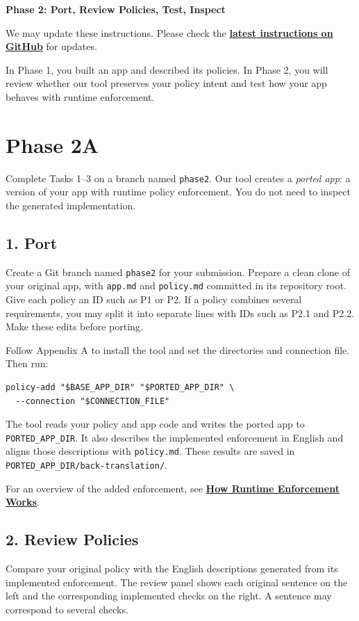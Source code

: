 \documentclass[10pt,a4paper]{article}
\begin{document}
\begin{center}
  {\LARGE\bfseries Phase 2: Port, Review Policies, Test, Inspect}
\end{center}
\vspace{-5pt}

We may update these instructions. Please check the
\href{https://github.com/thaddywu/CS239-Phase2/blob/main/phase2-instructions.pdf}{\textbf{latest instructions on GitHub}}
for updates.

In Phase 1, you built an app and described its policies. In Phase 2, you will
review whether our tool preserves your policy intent and test how your app
behaves with runtime enforcement.

\section*{Phase 2A}
Complete Tasks 1--3 on a branch named \texttt{phase2}. Our tool creates a
\emph{ported app}: a version of your app with runtime policy enforcement.
You do not need to inspect the generated implementation.

\subsection*{1. Port}
Create a Git branch named \texttt{phase2} for your submission. Prepare a clean
clone of your original app, with \texttt{app.md} and \texttt{policy.md} committed
in its repository root. Give each policy an ID such as P1 or P2. If a policy
combines several requirements, you may split it into separate lines with IDs
such as P2.1 and P2.2. Make these edits before porting.

Follow Appendix A to install the tool and set the directories and connection file.
Then run:
\begin{lstlisting}
policy-add "$BASE_APP_DIR" "$PORTED_APP_DIR" \
  --connection "$CONNECTION_FILE"
\end{lstlisting}
The tool reads your policy and app code and writes the ported app to
\texttt{PORTED\_APP\_DIR}. It also describes the implemented enforcement in English
and aligns those descriptions with \texttt{policy.md}. These results are saved in
\texttt{PORTED\_APP\_DIR/back-translation/}.

For an overview of the added enforcement, see
\href{https://github.com/thaddywu/CS239-Phase2/blob/main/how-runtime-enforcement-works.pdf}{\textbf{How Runtime Enforcement Works}}.

\subsection*{2. Review Policies}
Compare your original policy with the English descriptions generated from its
implemented enforcement. The review panel shows each original sentence on the
left and the corresponding implemented checks on the right. A sentence may
correspond to several checks.
\end{document}
